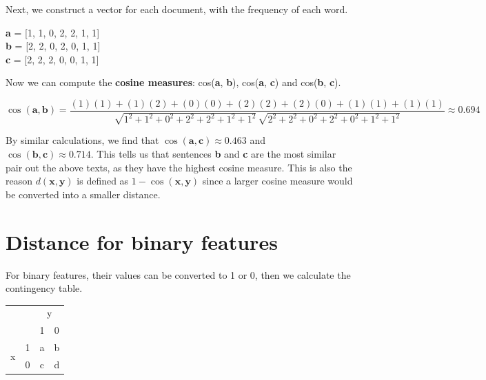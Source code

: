 \documentclass[11pt,fleqn]{book} %
\begin{document}
\noindent
Next, we construct a vector for each document, with the frequency of each word.
\begin{center}
	\textbf{a} = [1, 1, 0, 2, 2, 1, 1]\\
	\textbf{b} = [2, 2, 0, 2, 0, 1, 1]\\
	\textbf{c} = [2, 2, 2, 0, 0, 1, 1]\\
\end{center}

\noindent
Now we can compute the \textbf{cosine measures}: cos(\textbf{a}, \textbf{b}), cos(\textbf{a}, \textbf{c}) and cos(\textbf{b}, \textbf{c}).

\begin{equation*}
	\cos(\mathbf{a}, \mathbf{b}) = \frac{(1)(1) + (1)(2) + (0)(0) + (2)(2) + (2)(0) + (1)(1) + (1)(1)}{\sqrt{1^2 + 1^2 + 0^2 + 2^2 + 2^2 + 1^2 + 1^2} \, \sqrt{2^2 + 2^2 + 0^2 + 2^2 + 0^2 + 1^2 + 1^2}} \approx 0.694
\end{equation*}

\noindent
By similar calculations, we find that $\cos(\mathbf{a}, \mathbf{c}) \approx 0.463$ and $\cos(\mathbf{b}, \mathbf{c}) \approx 0.714$. This tells us that sentences \textbf{b} and \textbf{c} are the most similar pair out the above texts, as they have the highest cosine measure. This is also the reason $d(\mathbf{x}, \mathbf{y})$ is defined as $1 - \cos(\mathbf{x}, \mathbf{y})$ since a larger cosine measure would be converted into a smaller distance.

\section{Distance for binary features}
For binary features, their values can be converted to 1 or 0, then we calculate the contingency table.

\begin{table}[h]
\centering
\begin{tabular}{cccc}
\multicolumn{2}{c}{\multirow{2}{*}{}}       & \multicolumn{2}{c}{y} \\
\multicolumn{2}{c}{}                        & 1         & 0         \\ \cline{2-4} 
\multirow{2}{*}{x} & \multicolumn{1}{c|}{1} & a         & b         \\
                   & \multicolumn{1}{c|}{0} & c         & d        
\end{tabular}
\end{table}
\end{document}
